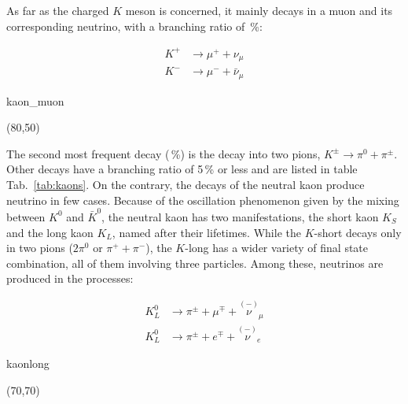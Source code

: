 As far as the charged $K$ meson is concerned, it mainly decays in a muon and its corresponding neutrino, %
with a branching ratio of \,\%:

\begin{minipage}[c][3cm][c]{0.5\textwidth}
	\centering
	\begin{align}
		K^+ &\rightarrow \mu^+ + \nu_\mu \\
		K^- &\rightarrow \mu^- + \bar{\nu}_\mu
	\end{align}
\end{minipage}
%
\begin{minipage}[c][3cm][c]{0.5\textwidth}
	\centering
	\begin{fmffile}{kaon_muon}
		\begin{fmfgraph*}(80,50)
		\end{fmfgraph*}
	\end{fmffile}
\end{minipage}

The second most frequent decay (\,\%) is the decay into two pions, $K^{\pm} \rightarrow \pi^0 + \pi^\pm$.
Other decays have a branching ratio of 5\,\% or less and are listed in table Tab.~\ref{tab:kaons}.
On the contrary, the decays of the neutral kaon produce neutrino in few cases.
Because of the oscillation phenomenon given by the mixing between $K^0$ and $\bar K^0$, the neutral kaon has two %
manifestations, the short kaon $K_S$ and the long kaon $K_L$, named after their lifetimes.
While the $K$-short decays only in two pions ($2 \pi^0$ or $\pi^+ + \pi^-$), the $K$-long has a wider variety %
of final state combination, all of them involving three particles.
Among these, neutrinos are produced in the processes:

\begin{minipage}[c][3cm][c]{0.5\textwidth}
	\centering
	\begin{align}
		K^0_L &\rightarrow \pi^\pm + \mu^\mp + \overset{(-)}{\nu}_\mu \\
		K^0_L &\rightarrow \pi^\pm + e^\mp + \overset{(-)}{\nu}_e 
	\end{align}
\end{minipage}
%
\begin{minipage}[c][3cm][c]{0.5\textwidth}
	\centering
	\begin{fmffile}{kaonlong}
		\begin{fmfgraph*}(70,70)
		\end{fmfgraph*}
	\end{fmffile}
\end{minipage}

